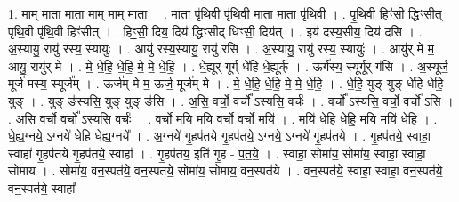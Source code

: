 \documentclass[17pt]{extarticle}
\begin{document}
1. माम् मा॒ता मा॒ता माम् माम् मा॒ता । . मा॒ता पृ॑थि॒वी पृ॑थि॒वी मा॒ता मा॒ता पृ॑थि॒वी । . पृ॒थि॒वी हिꣳ॑सी द्धिꣳसीत् पृथि॒वी पृ॑थि॒वी हिꣳ॑सीत् । . हिꣳ॒॒सी॒ दिय॒ दिय॑ द्धिꣳसीद् धिꣳसी॒ दिय॑त् । . इय॑ दस्य॒सीय॒ दिय॑ दसि । . अ॒स्यायु॒ रायु॑ रस्य॒ स्यायुः॑ । . आयु॑ रस्य॒स्यायु॒ रायु॑ रसि । . अ॒स्यायु॒ रायु॑ रस्य॒ स्यायुः॑ । . आयु॑र् मे म॒ आयु॒ रायु॑र् मे । . मे॒ धे॒हि॒ धे॒हि॒ मे॒ मे॒ धे॒हि॒ । . धे॒ह्यूर् गूर्ग् धे॑हि धे॒ह्यूर्क् । . ऊर्ग॑स्य॒ स्यूर्गूर् ग॑सि । . अ॒स्यूर्ज॒ मूर्ज॑ मस्य॒ स्यूर्ज᳚म् । . ऊर्ज॑म् मे म॒ ऊर्ज॒ मूर्ज॑म् मे । . मे॒ धे॒हि॒ धे॒हि॒ मे॒ मे॒ धे॒हि॒ । . धे॒हि॒ युङ् युङ् धे॑हि धेहि॒ युङ् । . युङ् ङ॑स्यसि॒ युङ् युङ् ङ॑सि । . अ॒सि॒ वर्चो॒ वर्चो᳚ ऽस्यसि॒ वर्चः॑ । . वर्चो᳚ ऽस्यसि॒ वर्चो॒ वर्चो॑ ऽसि । . अ॒सि॒ वर्चो॒ वर्चो᳚ ऽस्यसि॒ वर्चः॑ । . वर्चो॒ मयि॒ मयि॒ वर्चो॒ वर्चो॒ मयि॑ । . मयि॑ धेहि धेहि॒ मयि॒ मयि॑ धेहि । . धे॒ह्य॒ग्नये॒ ऽग्नये॑ धेहि धेह्य॒ग्नये᳚ । . अ॒ग्नये॑ गृ॒हप॑तये गृ॒हप॑तये॒ ऽग्नये॒ ऽग्नये॑ गृ॒हप॑तये । . गृ॒हप॑तये॒ स्वाहा॒ स्वाहा॑ गृ॒हप॑तये गृ॒हप॑तये॒ स्वाहा᳚ । . गृ॒हप॑तय॒ इति॑ गृ॒ह - प॒त॒ये॒ । . स्वाहा॒ सोमा॑य॒ सोमा॑य॒ स्वाहा॒ स्वाहा॒ सोमा॑य । . सोमा॑य॒ वन॒स्पत॑ये॒ वन॒स्पत॑ये॒ सोमा॑य॒ सोमा॑य॒ वन॒स्पत॑ये । . वन॒स्पत॑ये॒ स्वाहा॒ स्वाहा॒ वन॒स्पत॑ये॒ वन॒स्पत॑ये॒ स्वाहा᳚ । \newline
\end{document}
